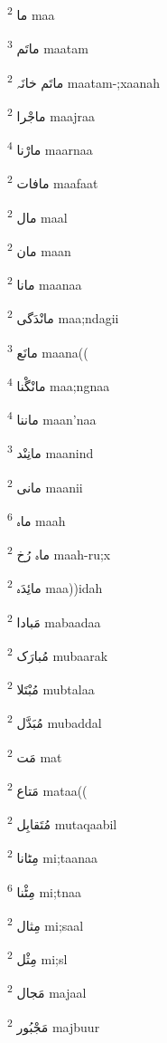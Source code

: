 \documentclass[12pt]{article}
\begin{document}
\begin{multicols}{5}
{\ur ما}   \textsuperscript{2} maa

{\ur ماتَم}   \textsuperscript{3} maatam

{\ur ماتَم خانَہ}   \textsuperscript{2} maatam-;xaanah

{\ur ماجْرا}   \textsuperscript{2} maajraa

{\ur مارْنا}   \textsuperscript{4} maarnaa

{\ur مافات}   \textsuperscript{2} maafaat

{\ur مال}   \textsuperscript{2} maal

{\ur مان}   \textsuperscript{2} maan

{\ur مانا}   \textsuperscript{2} maanaa

{\ur مانْدَگی}   \textsuperscript{2} maa;ndagii

{\ur مانَع}   \textsuperscript{3} maana((

{\ur مانْگْنا}   \textsuperscript{4} maa;ngnaa

{\ur ماننا}   \textsuperscript{4} maan'naa

{\ur مانِنْد}   \textsuperscript{3} maanind

{\ur مانی}   \textsuperscript{2} maanii

{\ur ماہ}   \textsuperscript{6} maah

{\ur ماہ رُخ}   \textsuperscript{2} maah-ru;x

{\ur مائِدَہ}   \textsuperscript{2} maa))idah

{\ur مَبادا}   \textsuperscript{2} mabaadaa

{\ur مُبارَک}   \textsuperscript{2} mubaarak

{\ur مُبْتَلا}   \textsuperscript{2} mubtalaa

{\ur مُبَدَّل}   \textsuperscript{2} mubaddal

{\ur مَت}   \textsuperscript{2} mat

{\ur مَتاع}   \textsuperscript{2} mataa((

{\ur مُتَقابِل}   \textsuperscript{2} mutaqaabil

{\ur مِٹانا}   \textsuperscript{2} mi;taanaa

{\ur مِٹْنا}   \textsuperscript{6} mi;tnaa

{\ur مِثال}   \textsuperscript{2} mi;saal

{\ur مِثْل}   \textsuperscript{2} mi;sl

{\ur مَجال}   \textsuperscript{2} majaal

{\ur مَجْبُور}   \textsuperscript{2} majbuur


\end{multicols}
\end{document}
